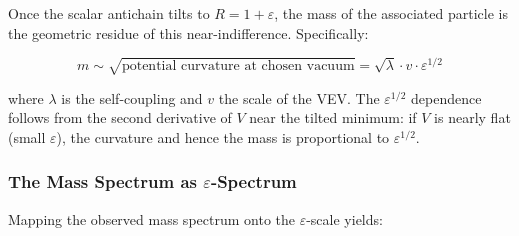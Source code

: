 Once the scalar antichain tilts to \(R = 1 + \varepsilon\), the mass of
the associated particle is the geometric residue of this
near-indifference. Specifically:

\[m \sim \sqrt{\text{potential curvature at chosen vacuum}} = \sqrt{\lambda} \cdot v \cdot \varepsilon^{1/2}\]

where \(\lambda\) is the self-coupling and \(v\) the scale of the VEV.
The \(\varepsilon^{1/2}\) dependence follows from the second derivative
of \(V\) near the tilted minimum: if \(V\) is nearly flat (small
\(\varepsilon\)), the curvature and hence the mass is proportional to
\(\varepsilon^{1/2}\).

\hypertarget{the-mass-spectrum-as-varepsilon-spectrum}{%
\subsubsection{\texorpdfstring{The Mass Spectrum as
\(\varepsilon\)-Spectrum}{The Mass Spectrum as \textbackslash varepsilon-Spectrum}}\label{the-mass-spectrum-as-varepsilon-spectrum}}

Mapping the observed mass spectrum onto the \(\varepsilon\)-scale
yields:

